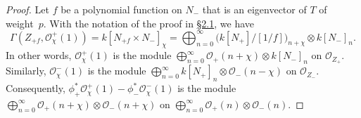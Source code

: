 \documentclass{article}
\newcommand{\scr}[1]{{\mathscr{#1}}}
\begin{document}
\begin{proof}
  Let $f$ be a polynomial function on $N_-$ that is an eigenvector of $T$ of weight~$p$.
  With the notation of the proof in \hyperref[2.1]{\S2.1}, we have
  \[
    \Gamma(Z_{+f},\scr{O}_\chi^+(1))
    = k[N_{+f}\times N_-]_\chi
    = \bigoplus_{n=0}^\infty\big(k[N_+]/[1/f]\big)_{n+\chi}\otimes k[N_-]_n.
  \]
  In other words, $\scr{O}_\chi^+(1)$ is the module $\bigoplus_{n=0}^\infty\scr{O}_+(n+\chi)\otimes k[N_-]_n$ on $\scr{O}_{Z_+}$.
  Similarly, $\scr{O}_\chi^-(1)$ is the module $\bigoplus_{n=0}^\infty k[N_+]_n\otimes\scr{O}_-(n-\chi)$ on $\scr{O}_{Z_-}$.
  Consequently, $\phi_+^*\scr{O}_\chi^+(1)-\phi_-^*\scr{O}_\chi^-(1)$ is the module $\bigoplus_{n=0}^\infty\scr{O}_+(n+\chi)\otimes\scr{O}_-(n+\chi)$ on $\bigoplus_{n=0}^\infty\scr{O}_+(n)\otimes\scr{O}_-(n)$.
\end{proof}







\nocite{*}
\end{document}
